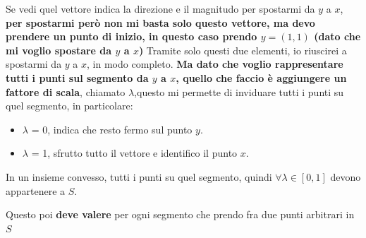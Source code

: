 Se vedi quel vettore indica la direzione e il magnitudo per spostarmi da $y$ a $x$, \textbf{per spostarmi però non mi basta solo questo vettore, ma devo prendere un punto di inizio, in questo caso prendo $y = (1,1)$ (dato che mi voglio spostare da $y$ a $x$)}
Tramite solo questi due elementi, io riuscirei a spostarmi da $y$ a $x$, in modo completo. \textbf{Ma dato che voglio rappresentare tutti i punti sul segmento da $y$ a $x$, quello
che faccio è aggiungere un fattore di scala}, chiamato $\lambda$,questo mi permette di inviduare tutti i punti su quel segmento, in particolare:
\begin{itemize}
    \item $\lambda$ = 0, indica che resto fermo sul punto $y$.
    \item $\lambda$ = 1, sfrutto tutto il vettore e identifico il punto $x$.
\end{itemize} 
\begin{center}
    In un insieme convesso, tutti i punti su quel segmento, quindi $\forall \lambda \in [0,1]$ devono appartenere a $S$.
\end{center}
Questo poi \textbf{deve valere} per ogni segmento che prendo fra due punti arbitrari in $S$

